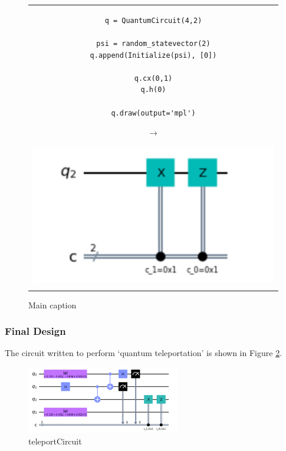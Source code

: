 \begin{figure}[h]
\centering
\begin{tabular}{c}
\begin{minipage}[c]{.45\linewidth}
\begin{verbatim}
q = QuantumCircuit(4,2)

psi = random_statevector(2)
q.append(Initialize(psi), [0])

q.cx(0,1)
q.h(0)

q.draw(output='mpl')
\end{verbatim}
\end{minipage}
\begin{minipage}[c]{.1\linewidth}
\centering
$\rightarrow$
\end{minipage}
\begin{minipage}[c]{.4\linewidth}
\centering
\includegraphics[width=\textwidth]{lab3/images/Step4.png}
\end{minipage}\\
\\ %
\end{tabular}
\caption{Main caption}
\label{step4}
\end{figure}

\subsubsection{Final Design}
The circuit written to perform `quantum teleportation' is shown in Figure \ref{fig:teleportCircuit}.
\begin{figure}[h]
    \centering
    \includegraphics[width=0.6\textwidth]{lab3/images/teleportCircuit.png}
    \caption{teleportCircuit}
    \label{fig:teleportCircuit}
\end{figure}

